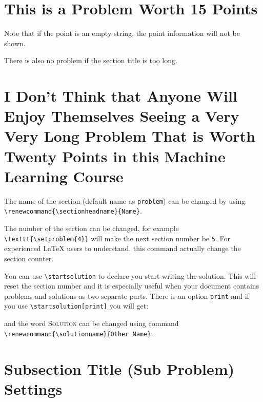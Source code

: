\documentclass{seu-ml-assign}
\renewcommand{\sectionheadname}{Section}
\begin{document}
      \renewcommand{\sectionheadname}{Problem}

      \section*{This is a Problem Worth 15 Points}
      Note that if the point is an empty string, the point information will not be shown.

      There is also no problem if the section title is too long.\vspace{-8mm}

      \section*{I Don't Think that Anyone Will Enjoy Themselves Seeing a Very Very Long Problem That is Worth Twenty Points in this Machine Learning Course}

      \renewcommand{\sectionheadname}{Section}

      The name of the section (default name as \texttt{problem}) can be changed by using \verb|\renewcommand{\sectionheadname}{Name}|.

    The number of the section can be changed, for example \verb|\texttt{\setproblem{4}}| will make the next section number be \texttt{5}.
    For experienced \LaTeX{} users to understand, this command actually change the section counter.

    You can use \verb|\startsolution| to declare you start writing the solution.
    This will reset the section number and it is especially useful when your document contains problems and solutions as two separate parts.
    There is an option \texttt{print} and if you use \verb|\startsolution[print]| you will get:

    \startsolution[print]
    and the word \textsc{Solution} can be changed using command \verb|\renewcommand{\solutionname}{Other Name}|.


  \section{Subsection Title (Sub Problem) Settings}
\end{document}
